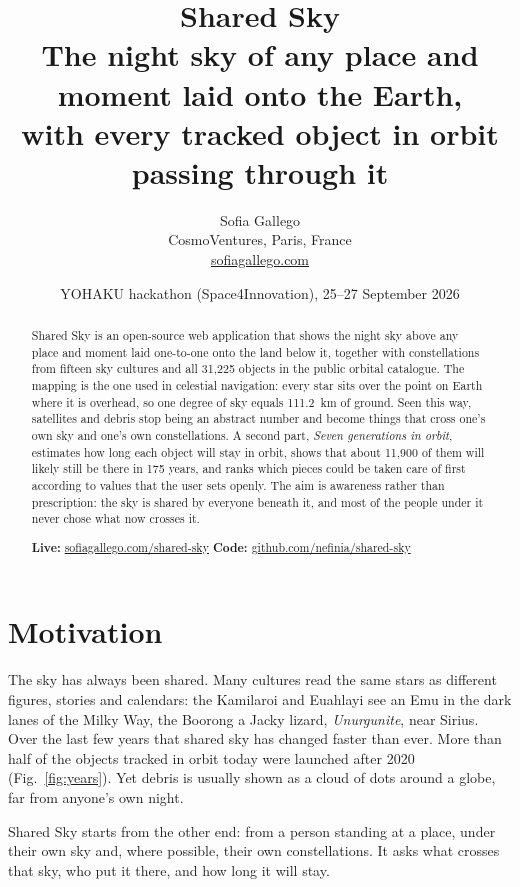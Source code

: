 \documentclass[11pt,a4paper]{article}
\title{\textbf{Shared Sky}\\[4pt]\large The night sky of any place and moment laid onto the Earth,\\ with every tracked object in orbit passing through it}
\author{Sofia Gallego\\[2pt]
\small CosmoVentures, Paris, France\\
\small \href{https://sofiagallego.com}{sofiagallego.com}}
\date{\small YOHAKU hackathon (Space4Innovation), 25--27 September 2026}
\begin{document}
\maketitle

\begin{abstract}
\noindent Shared Sky is an open-source web application that shows the night sky above any place and moment laid one-to-one onto the land below it, together with constellations from fifteen sky cultures and all 31{,}225 objects in the public orbital catalogue. The mapping is the one used in celestial navigation: every star sits over the point on Earth where it is overhead, so one degree of sky equals 111.2~km of ground. Seen this way, satellites and debris stop being an abstract number and become things that cross one's own sky and one's own constellations. A second part, \emph{Seven generations in orbit}, estimates how long each object will stay in orbit, shows that about 11{,}900 of them will likely still be there in 175 years, and ranks which pieces could be taken care of first according to values that the user sets openly. The aim is awareness rather than prescription: the sky is shared by everyone beneath it, and most of the people under it never chose what now crosses it.

\smallskip
\noindent\textbf{Live:} \href{https://sofiagallego.com/shared-sky/}{sofiagallego.com/shared-sky} \quad \textbf{Code:} \href{https://github.com/nefinia/shared-sky}{github.com/nefinia/shared-sky}
\end{abstract}

\section{Motivation}
The sky has always been shared. Many cultures read the same stars as different figures, stories and calendars: the Kamilaroi and Euahlayi see an Emu in the dark lanes of the Milky Way, the Boorong a Jacky lizard, \emph{Unurgunite}, near Sirius. Over the last few years that shared sky has changed faster than ever. More than half of the objects tracked in orbit today were launched after 2020 (Fig.~\ref{fig:years}). Yet debris is usually shown as a cloud of dots around a globe, far from anyone's own night.

Shared Sky starts from the other end: from a person standing at a place, under their own sky and, where possible, their own constellations. It asks what crosses that sky, who put it there, and how long it will stay.
\end{document}
